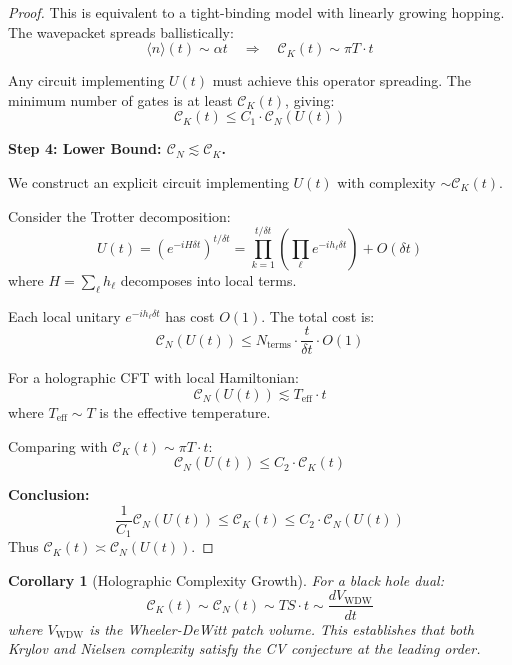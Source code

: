 \documentclass[12pt,a4paper]{article}
\newtheorem{corollary}[theorem]{Corollary}
\begin{document}
\begin{proof}
This is equivalent to a tight-binding model with linearly growing hopping. The wavepacket spreads ballistically:
\begin{equation}
\langle n \rangle(t) \sim \alpha t \quad \Rightarrow \quad \mathcal{C}_K(t) \sim \pi T \cdot t
\end{equation}

Any circuit implementing $U(t)$ must achieve this operator spreading. The minimum number of gates is at least $\mathcal{C}_K(t)$, giving:
\begin{equation}
\mathcal{C}_K(t) \leq C_1 \cdot \mathcal{C}_N(U(t))
\end{equation}

\textbf{Step 4: Lower Bound: $\mathcal{C}_N \lesssim \mathcal{C}_K$.}

We construct an explicit circuit implementing $U(t)$ with complexity $\sim \mathcal{C}_K(t)$.

Consider the Trotter decomposition:
\begin{equation}
U(t) = \left( e^{-iH\delta t} \right)^{t/\delta t} = \prod_{k=1}^{t/\delta t} \left( \prod_\ell e^{-i h_\ell \delta t} \right) + O(\delta t)
\end{equation}
where $H = \sum_\ell h_\ell$ decomposes into local terms.

Each local unitary $e^{-ih_\ell \delta t}$ has cost $O(1)$. The total cost is:
\begin{equation}
\mathcal{C}_N(U(t)) \leq N_{\text{terms}} \cdot \frac{t}{\delta t} \cdot O(1)
\end{equation}

For a holographic CFT with local Hamiltonian:
\begin{equation}
\mathcal{C}_N(U(t)) \lesssim T_{\text{eff}} \cdot t
\end{equation}
where $T_{\text{eff}} \sim T$ is the effective temperature.

Comparing with $\mathcal{C}_K(t) \sim \pi T \cdot t$:
\begin{equation}
\mathcal{C}_N(U(t)) \leq C_2 \cdot \mathcal{C}_K(t)
\end{equation}

\textbf{Conclusion:}
\begin{equation}
\frac{1}{C_1} \mathcal{C}_N(U(t)) \leq \mathcal{C}_K(t) \leq C_2 \cdot \mathcal{C}_N(U(t))
\end{equation}
Thus $\mathcal{C}_K(t) \asymp \mathcal{C}_N(U(t))$.
\end{proof}

\begin{corollary}[Holographic Complexity Growth]
For a black hole dual:
\begin{equation}
\mathcal{C}_K(t) \sim \mathcal{C}_N(t) \sim T S \cdot t \sim \frac{dV_{\text{WDW}}}{dt}
\end{equation}
where $V_{\text{WDW}}$ is the Wheeler-DeWitt patch volume. This establishes that both Krylov and Nielsen complexity satisfy the CV conjecture at the leading order.
\end{corollary}
\end{document}
